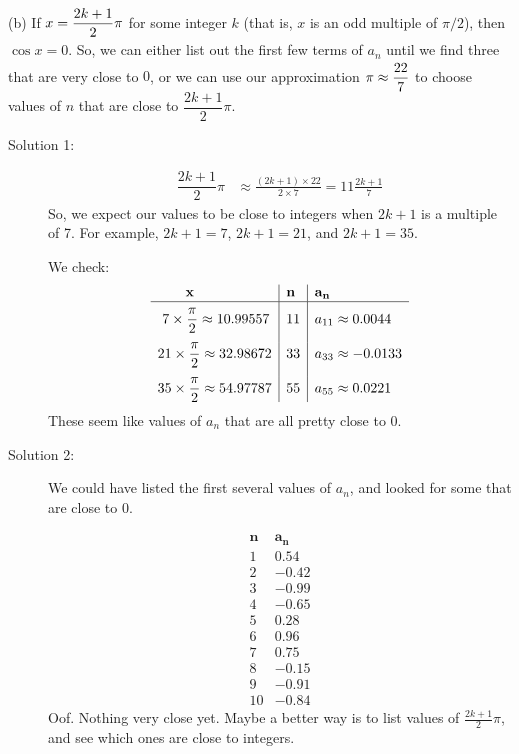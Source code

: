 \begin{solution}
\noindent (b) If $x  = \dfrac{2k+1}{\vphantom{_1}2}\pi$  for some integer $k$ (that is, $x$ is an odd multiple of $\pi/2$), then $\cos x =0$. So, we can either list out the first few terms of $a_n$ until we find three that are very close to $0$, or we can use our approximation $\pi\approx \dfrac{22\vphantom{^1}}{7}$ to choose values of $n$ that are close to
$\dfrac{2k+1}{2}\pi$.

\begin{description}
\item[Solution 1:]
\begin{align*}
\dfrac{2k+1}{2}\pi&\approx \frac{(2k+1)\times 22}{2\times 7}=11\frac{2k+1}{7}
\end{align*}
So, we expect our values to be close to integers when
$2k+1$ is a multiple of 7. For example, $2k+1=7$, $2k+1=21$, and $2k+1=35$.

We check:
\[\begin{array}{l| l| l}
\qquad\mathbf{x}&\mathbf{n}  & \mathbf{a_n}\\
\hline
~7\times \dfrac{\pi\vphantom{^A}}{2}\approx 10.99557 & 11&a_{11}\approx0.0044\\[10pt]
21\times \dfrac{\pi}{2} \approx 32.98672&33&a_{33}\approx-0.0133\\[10pt]
35\times \dfrac{\pi}{2} \approx 54.97787&55& a_{55}\approx 0.0221\\
\end{array}
\]
These seem like values of $a_n$ that are all pretty close to 0.
\item[Solution 2:]
We could have listed the first several values of $a_n$, and looked for some that are close to 0.

\[\begin{array}{c|c}
\mathbf{n}&\mathbf{a_n}\\
\hline
1&0.54\\
2&-0.42\\
3&-0.99\\
4&-0.65\\
5&0.28\\
6&0.96\\
7&0.75\\
8&-0.15\\
9&-0.91\\
10&-0.84
\end{array}
\]
Oof. Nothing very close yet. Maybe a better way is  to list values of $\frac{2k+1}{2}\pi$, and see which ones are close to integers.


\end{description}
\end{solution}
